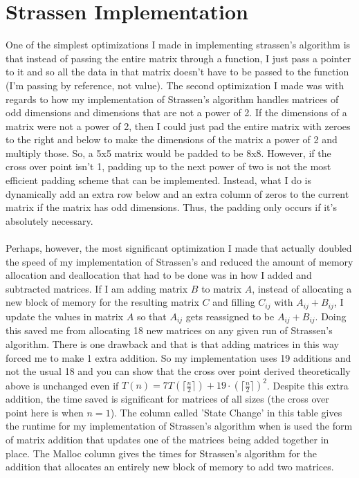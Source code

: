 \documentclass{article}
\begin{document}
	\section{Strassen Implementation}
	One of the simplest optimizations I made in implementing strassen's algorithm is that instead of passing the entire matrix through a function, I just pass a pointer to it and so all the data in that matrix doesn't have to be passed to the function (I'm passing by reference, not value).  The second optimization I made was with regards to how my implementation of Strassen's algorithm handles matrices of odd dimensions and dimensions that are not a power of 2.  If the dimensions of a matrix were not a power of 2, then I could just pad the entire matrix with zeroes to the right and below to make the dimensions of the matrix a power of 2 and multiply those.  So, a 5x5 matrix would be padded to be 8x8. However, if the cross over point isn't 1, padding up to the next power of two is not the most efficient padding scheme that can be implemented.  Instead, what I do is dynamically add an extra row below and an extra column of zeros to the current matrix if the matrix has odd dimensions.  Thus, the padding only occurs if it's absolutely necessary. \\\\
	\noindent
	Perhaps, however, the most significant optimization I made that actually doubled the speed of my implementation of Strassen's and reduced the amount of memory allocation and deallocation that had to be done was in how I added and subtracted matrices.  If I am adding matrix $B$ to matrix $A$, instead of allocating a new block of memory for the resulting matrix $C$ and filling $C_{ij}$ with $A_{ij} + B_{ij}$, I update the values in matrix $A$ so that $A_{ij}$ gets reassigned to be $A_{ij}+B_{ij}$. Doing this saved me from allocating 18 new matrices on any given run of Strassen's algorithm.  There is one drawback and that is that adding matrices in this way forced me to make 1 extra addition. So my implementation uses 19 additions and not the usual 18 and you can show that the cross over point derived theoretically above is unchanged even if $T(n) = 7T(\lceil \frac{n}{2} \rceil) + 19\cdot(\lceil \frac{n}{2} \rceil)^2$.  Despite this extra addition, the time saved is significant for matrices of all sizes (the cross over point here is when $n = 1$). The column called 'State Change' in this table gives the runtime for my implementation of Strassen's algorithm when is used the form of matrix addition that updates one of the matrices being added together in place.  The Malloc column gives the times for Strassen's algorithm for the addition that allocates an entirely new block of memory to add two matrices.  \\ 
\end{document}
